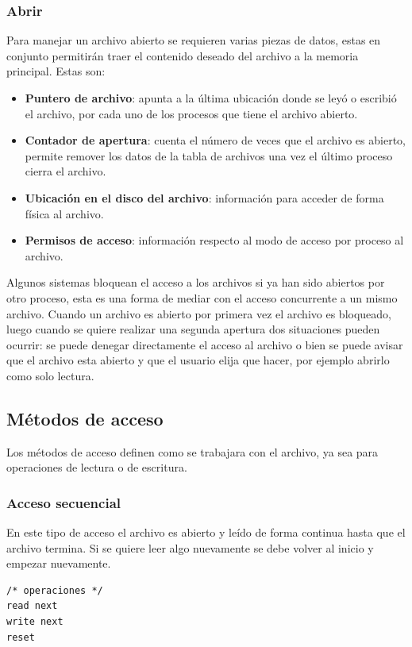 \subsubsection{Abrir}
Para manejar un archivo abierto se requieren varias piezas de datos, estas en
conjunto permitirán traer el contenido deseado del archivo a la memoria
principal. Estas son:

\begin{itemize}
	\item \textbf{Puntero de archivo}: apunta a la última ubicación donde se
leyó o escribió el archivo, por cada uno de los procesos que tiene el archivo
abierto.
	\item \textbf{Contador de apertura}: cuenta el número de veces que el
archivo es abierto, permite remover los datos de la tabla de archivos una vez el
último proceso cierra el archivo.
	\item \textbf{Ubicación en el disco del archivo}: información para
acceder de forma física al archivo.
	\item \textbf{Permisos de acceso}: información respecto al modo de
acceso por proceso al archivo.
\end{itemize}

Algunos sistemas bloquean el acceso a los archivos si ya han sido abiertos por
otro proceso, esta es una forma de mediar con el acceso concurrente a un mismo
archivo. Cuando un archivo es abierto por primera vez el archivo es bloqueado,
luego cuando se quiere realizar una segunda apertura dos situaciones pueden
ocurrir: se puede denegar directamente el acceso al archivo o bien se puede
avisar que el archivo esta abierto y que el usuario elija que hacer, por ejemplo
abrirlo como solo lectura.

\subsection{Métodos de acceso}
Los métodos de acceso definen como se trabajara con el archivo, ya sea para
operaciones de lectura o de escritura.

\subsubsection{Acceso secuencial}
En este tipo de acceso el archivo es abierto y leído de forma continua hasta que
el archivo termina. Si se quiere leer algo nuevamente se debe volver al inicio y
empezar nuevamente.

\begin{verbatim}
/* operaciones */
read next
write next
reset
\end{verbatim}

